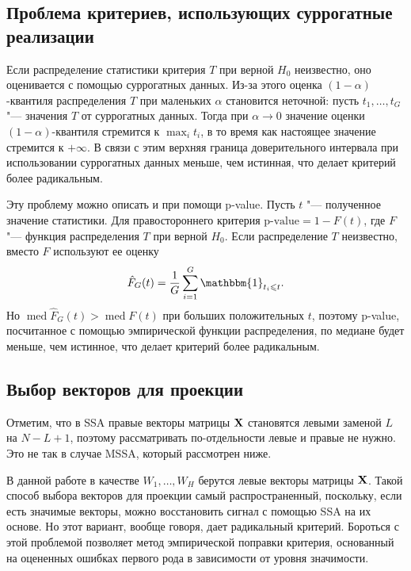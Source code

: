 \documentclass[specialist,
substylefile = spbu_report.rtx,
subf,href,colorlinks=true, 12pt]{disser}
\theoremstyle{definition}
\begin{document}
\subsection{Проблема критериев, использующих суррогатные реализации}\label{sect:problem}
Если распределение статистики критерия $T$ при верной $H_0$ неизвестно, оно оценивается с помощью суррогатных данных. Из-за этого оценка $(1-\alpha)$-квантиля распределения $T$ при маленьких $\alpha$ становится неточной: пусть $t_1,\ldots,t_G$ "--- значения $T$ от суррогатных данных. Тогда при $\alpha\to 0$ значение оценки $(1-\alpha)$-квантиля стремится к $\max_i t_i$, в то время как настоящее значение стремится к $+\infty$. В связи с этим верхняя граница доверительного интервала при использовании суррогатных данных меньше, чем истинная, что делает критерий более радикальным. 

Эту проблему можно описать и при помощи p-value. Пусть $t$ "--- полученное значение статистики. Для правостороннего критерия $\text{p-value}=1-F(t)$, где $F$ "--- функция распределения $T$ при верной $H_0$. Если распределение $T$ неизвестно, вместо $F$ используют ее оценку
\[
	\hat F_G(t)=\frac{1}G\sum_{i=1}^G \mathbbm{1}_{t_i\leqslant t}.	
\]
Но $\operatorname{med} \hat F_G(t) > \operatorname{med} F(t)$ при больших положительных $t$, поэтому p-value, посчитанное с помощью эмпирической функции распределения, по медиане будет меньше, чем истинное, что делает критерий более радикальным.

\subsection{Выбор векторов для проекции}\label{sect:vectors_choise}
Отметим, что в SSA правые векторы матрицы $\mathbf{X}$ становятся левыми заменой $L$ на $N-L+1$, поэтому рассматривать по-отдельности левые и правые не нужно. Это не так в случае MSSA, который рассмотрен ниже.

В данной работе в качестве $W_1, \ldots,W_H$ берутся левые векторы матрицы $\mathbf{X}$. Такой способ выбора векторов для проекции самый распространенный, поскольку, если есть значимые векторы, можно восстановить сигнал с помощью SSA на их основе. Но этот вариант, вообще говоря, дает радикальный критерий. Бороться с этой проблемой позволяет метод эмпирической поправки критерия, основанный на оцененных ошибках первого рода в зависимости
от уровня значимости.
\end{document}

